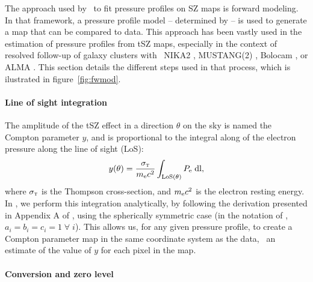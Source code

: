 The approach used by \panco\ to fit pressure profiles on SZ maps is forward modeling.
In that framework, a pressure profile model -- determined by  -- is used to generate a map that can be compared to data.
This approach has been vastly used in the estimation of pressure profiles from tSZ maps, especially in the context of resolved follow-up of galaxy clusters with \eg\ NIKA2 \citep[\eg][]{munoz-echeverria_multi-probe_2022,keruzore_exploiting_2020}, MUSTANG(2) \citep[\eg][]{romero_galaxy_2017,romero_pressure_2020}, Bolocam \citep[\eg][]{sayers_evolution_2022}, or ALMA \citep[\eg][]{di_mascolo_joint_2019}.
This section details the different steps used in that process, which is ilustrated in figure~\ref{fig:fwmod}.

\paragraph{Line of sight integration}

The amplitude of the tSZ effect in a direction $\theta$ on the sky is named the Compton parameter $y$, and is proportional to the integral along of the electron pressure along the line of sight (LoS):
\begin{equation}
    \label{eq:algo_ysz}
    y(\theta) = \frac{\sigma_\textsc{t}}{m_{\rm e}c^2} \int_{\rm LoS(\theta)} P_{\rm e} \; \dd l,
\end{equation}
where $\sigma_\textsc{t}$ is the Thompson cross-section, and $m_{\rm e} c^2$ is the electron resting energy. \\
In \panco, we perform this integration analytically, by following the derivation presented in Appendix A of \citet{romero_multi-instrument_2018}, using the spherically symmetric case (in the notation of \citeauthor{romero_multi-instrument_2018}, $a_i = b_i = c_i = 1 \; \forall \; i$).
This allows us, for any given pressure profile, to create a Compton parameter map in the same coordinate system as the data, \ie\ an estimate of the value of $y$ for each pixel in the map.

\paragraph{Conversion and zero level}

